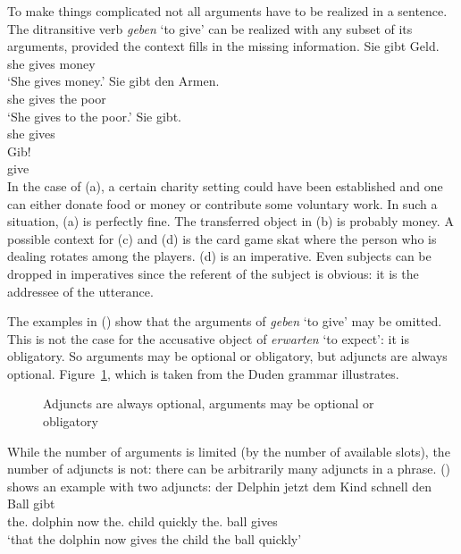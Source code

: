To make things complicated not all arguments have to be realized in a
sentence.\label{page-optional-arguments} The ditransitive verb \emph{geben} `to give' can be
realized with any subset of its arguments, provided the context fills in the missing information.
\eal
\ex 
\gll Sie gibt Geld.\\
     she gives money\\\german
\glt `She gives money.'
\ex 
\gll Sie gibt den Armen.\\
     she gives the poor\\
\glt `She gives to the poor.'
\ex\label{ex-sie-gibt} 
\gll Sie gibt.\\
     she gives\\
\ex 
\gll Gib!\\
     give\\
\zl
\largerpage
In the case of (a), a certain charity setting could have been established and one can either
donate food or money or contribute some voluntary work. In such a situation, (a) is perfectly
fine. The transferred object in (b) is probably money. A possible context for (c) and
(d) is the card game skat where the person who is dealing rotates among the
players. (d) is an imperative. Even subjects can be dropped in imperatives since the referent
of the subject is obvious: it is the addressee of the utterance. 

The examples in () show that the arguments of \emph{geben} `to give' may be omitted. This is
not the case for the accusative object of \emph{erwarten} `to expect': it is obligatory. So
arguments may be optional or obligatory, but adjuncts are always optional. Figure~\ref{fig-optional-arguments-adjuncts}, which is
taken from the Duden grammar \citep[§1182]{Duden2005} illustrates.
\begin{figure}
\caption{\label{fig-optional-arguments-adjuncts}Adjuncts are always optional, arguments may be
  optional or obligatory \citep[§1182]{Duden2005}} 
\end{figure}

While the number of arguments is limited (by the number of available slots), the number of adjuncts is not: there can be
arbitrarily many adjuncts in a phrase. () shows an example with two adjuncts:
\ea
\gll \dass{} der        Delphin jetzt dem        Kind  schnell den        Ball gibt\\
     \that{} the.\NOM{} dolphin now   the.\DAT{} child quickly the.\ACC{} ball gives\\
\glt `that the dolphin now gives the child the ball quickly'
\z

